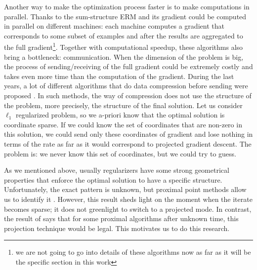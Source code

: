 Another way to make the optimization process faster is to make computations in parallel. Thanks to the sum-structure ERM and its gradient could be computed in parallel on different machines: each machine computes a gradient that corresponds to some subset of examples and after the results are aggregated to the full gradient\footnote{we are not going to go into details of these algorithms now as far as it will be the specific section in this work}. Together with computational speedup, these algorithms also bring a bottleneck: communication. When the dimension of the problem is big, the process of sending/receiving of the full gradient could be extremely costly and takes even more time than the computation of the gradient. During the last years, a lot of different algorithms that do data compression before sending were proposed \cite{alistarh2017qsgd, wangni2018gradient, hubara2017quantized, wang2017efficient}. In such methods, the way of compression does not use the structure of the problem, more precisely, the structure of the final solution. Let us consider $\ell_1$ regularized problem, so we a-priori know that the optimal solution is coordinate sparse. If we could know the set of coordinates that are non-zero in this solution, we could send only these coordinates of gradient and lose nothing in terms of the rate as far as it would correspond to projected gradient descent. The problem is: we never know this set of coordinates, but we could try to guess. 

As we mentioned above, usually regularizers have some strong geometrical properties that enforce the optimal solution to have a specific structure. Unfortunately, the exact pattern is unknown, but proximal point methods allow us to identify it \cite{nutini2019active}. However, this result sheds light on the moment when the iterate becomes sparse; it does not greenlight to switch to a projected mode. In contrast, the result of \cite{fadili2018sensitivity} says that for some proximal algorithms after unknown time, this projection technique would be legal. {\color{blue} This motivates us to do this research.}